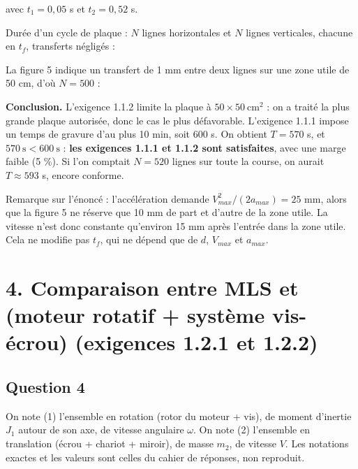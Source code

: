 \documentclass[11pt,a4paper]{article}
\newcommand{\equationajustee}[1]{%
  \sbox{\boiteequation}{$\displaystyle #1$}%
  \ifdim\wd\boiteequation>\linewidth
    \[\resizebox{\linewidth}{!}{\usebox{\boiteequation}}\]%
  \else
    \[#1\]%
  \fi}
\begin{document}
avec \(t_1=0{,}05\) s et \(t_2=0{,}52\) s.

Durée d'un cycle de plaque : \(N\) lignes horizontales et \(N\) lignes verticales, chacune en \(t_f\), transferts négligés :

\equationajustee{
\boxed{T=2N\,t_f}
}

La figure 5 indique un transfert de 1 mm entre deux lignes sur une zone utile de 50 cm, d'où \(N=500\) :

\equationajustee{
\begin{aligned}
T&=2\times500\times0{,}57\\
&=570\ \text{s}\\
&=9\ \text{min}\ 30\ \text{s}
\end{aligned}
}

\textbf{Conclusion.} L'exigence 1.1.2 limite la plaque à \(50\times50\ \mathrm{cm^2}\) : on a traité la plus grande plaque autorisée, donc le cas le plus défavorable. L'exigence 1.1.1 impose un temps de gravure d'au plus 10 min, soit 600 s. On obtient \(T=570\) s, et \(570\ \text{s}<600\ \text{s}\) : \textbf{les exigences 1.1.1 et 1.1.2 sont satisfaites}, avec une marge faible (5 \%). Si l'on comptait \(N=520\) lignes sur toute la course, on aurait \(T\approx593\) s, encore conforme.

Remarque sur l'énoncé : l'accélération demande \(V_{max}^2/(2a_{max})=25\) mm, alors que la figure 5 ne réserve que 10 mm de part et d'autre de la zone utile. La vitesse n'est donc constante qu'environ 15 mm après l'entrée dans la zone utile. Cela ne modifie pas \(t_f\), qui ne dépend que de \(d\), \(V_{max}\) et \(a_{max}\).

\hypertarget{comparaison-entre-mls-et-moteur-rotatif-systuxe8me-vis-uxe9crou-exigences-1.2.1-et-1.2.2}{%
\section{4. Comparaison entre MLS et (moteur rotatif + système vis-écrou) (exigences 1.2.1 et 1.2.2)}\label{comparaison-entre-mls-et-moteur-rotatif-systuxe8me-vis-uxe9crou-exigences-1.2.1-et-1.2.2}}

\hypertarget{question-4}{%
\subsection{Question 4}\label{question-4}}

On note (1) l'ensemble en rotation (rotor du moteur + vis), de moment d'inertie \(J_1\) autour de son axe, de vitesse angulaire \(\omega\). On note (2) l'ensemble en translation (écrou + chariot + miroir), de masse \(m_2\), de vitesse \(V\). Les notations exactes et les valeurs sont celles du cahier de réponses, non reproduit.
\end{document}
